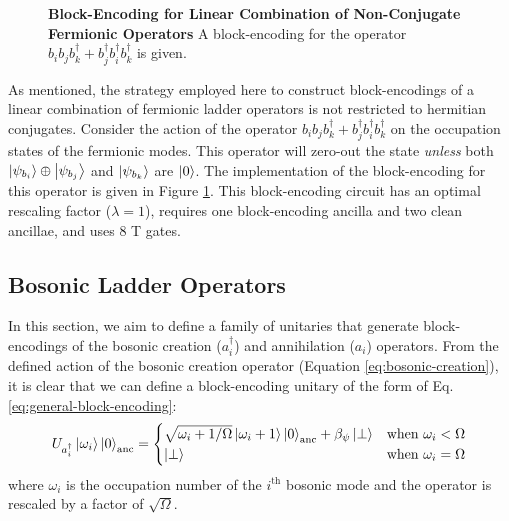 \begin{figure}
    
    \caption{
        \textbf{Block-Encoding for Linear Combination of Non-Conjugate Fermionic Operators}
        A block-encoding for the operator $b_i b_j b_k^\dagger + b_j^\dagger b_i^\dagger b_k^\dagger$ is given.
    }
    \label{fig:fermionic-be-lc-not-conjugate}
\end{figure}

As mentioned, the strategy employed here to construct block-encodings of a linear combination of fermionic ladder operators is not restricted to hermitian conjugates.
Consider the action of the operator $b_i b_j b_k^\dagger + b_j^\dagger b_i^\dagger b_k^\dagger$ on the occupation states of the fermionic modes.
This operator will zero-out the state \textit{unless} both $\ket{\psi_{b_i}} \oplus \ket{\psi_{b_j}}$ and $\ket{\psi_{b_k}}$ are $\ket{0}$.
The implementation of the block-encoding for this operator is given in Figure \ref{fig:fermionic-be-lc-not-conjugate}.
This block-encoding circuit has an optimal rescaling factor ($\lambda = 1$), requires one block-encoding ancilla and two clean ancillae, and uses $8$ T gates.

\subsection{Bosonic Ladder Operators}

In this section, we aim to define a family of unitaries that generate block-encodings of the bosonic creation ($a_i^\dagger$) and annihilation ($a_i$) operators.
From the defined action of the bosonic creation operator (Equation \ref{eq:bosonic-creation}), it is clear that we can define a block-encoding unitary of the form of Eq. \ref{eq:general-block-encoding}: 
\begin{equation}
    \label{eq:be-bos-creation}
    U_{a^\dagger_i} \ket{\omega_i} \ket{0}_\text{anc} = 
    \begin{cases}
        \sqrt{\omega_i + 1 / \Omega} \ket{\omega_i + 1} \ket{0}_\text{anc} + \beta_\psi \ket{\perp} & \text{when } \omega_i < \Omega \\
        \ket{\perp} & \text{when } \omega_i = \Omega \\
    
    \end{cases}
\end{equation}
where $\omega_i$ is the occupation number of the $i^\text{th}$ bosonic mode and the operator is rescaled by a factor of $\sqrt{\Omega}$.

